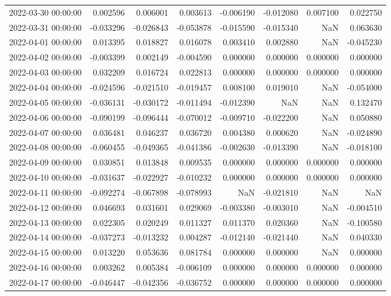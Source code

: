 \begin{tabular}{lrrrrrrr}
2022-03-30 00:00:00 & 0.002596 & 0.006001 & 0.003613 & -0.006190 & -0.012080 & 0.007100 & 0.022750 \\
2022-03-31 00:00:00 & -0.033296 & -0.026843 & -0.053878 & -0.015590 & -0.015340 & NaN & 0.063630 \\
2022-04-01 00:00:00 & 0.013395 & 0.018827 & 0.016078 & 0.003410 & 0.002880 & NaN & -0.045230 \\
2022-04-02 00:00:00 & -0.003399 & 0.002149 & -0.004590 & 0.000000 & 0.000000 & 0.000000 & 0.000000 \\
2022-04-03 00:00:00 & 0.032209 & 0.016724 & 0.022813 & 0.000000 & 0.000000 & 0.000000 & 0.000000 \\
2022-04-04 00:00:00 & -0.024596 & -0.021510 & -0.019457 & 0.008100 & 0.019010 & NaN & -0.054000 \\
2022-04-05 00:00:00 & -0.036131 & -0.030172 & -0.011494 & -0.012390 & NaN & NaN & 0.132470 \\
2022-04-06 00:00:00 & -0.090199 & -0.096444 & -0.070012 & -0.009710 & -0.022200 & NaN & 0.050880 \\
2022-04-07 00:00:00 & 0.036481 & 0.046237 & 0.036720 & 0.004380 & 0.000620 & NaN & -0.024890 \\
2022-04-08 00:00:00 & -0.060455 & -0.049365 & -0.041386 & -0.002630 & -0.013390 & NaN & -0.018100 \\
2022-04-09 00:00:00 & 0.030851 & 0.013848 & 0.009535 & 0.000000 & 0.000000 & 0.000000 & 0.000000 \\
2022-04-10 00:00:00 & -0.031637 & -0.022927 & -0.010232 & 0.000000 & 0.000000 & 0.000000 & 0.000000 \\
2022-04-11 00:00:00 & -0.092274 & -0.067898 & -0.078993 & NaN & -0.021810 & NaN & NaN \\
2022-04-12 00:00:00 & 0.046693 & 0.031601 & 0.029069 & -0.003380 & -0.003010 & NaN & -0.004510 \\
2022-04-13 00:00:00 & 0.022305 & 0.020249 & 0.011327 & 0.011370 & 0.020360 & NaN & -0.100580 \\
2022-04-14 00:00:00 & -0.037273 & -0.013232 & 0.004287 & -0.012140 & -0.021440 & NaN & 0.040330 \\
2022-04-15 00:00:00 & 0.013220 & 0.053636 & 0.081784 & 0.000000 & 0.000000 & NaN & 0.000000 \\
2022-04-16 00:00:00 & 0.003262 & 0.005384 & -0.006109 & 0.000000 & 0.000000 & 0.000000 & 0.000000 \\
2022-04-17 00:00:00 & -0.046447 & -0.042356 & -0.036752 & 0.000000 & 0.000000 & 0.000000 & 0.000000 \\

\end{tabular}

